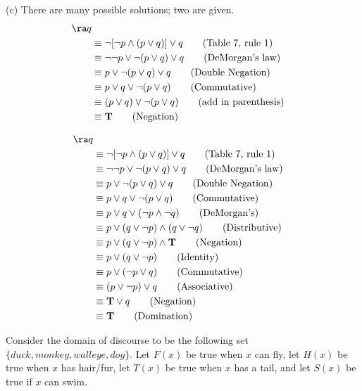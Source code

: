 \begin{questions}
\begin{solution}
    (c)
    There are many possible solutions; two are given.
	\small
    \begin{align*}
        [ \neg p & \wedge (p \vee q) ] \ra q \\
        & \equiv \neg [ \neg p \wedge (p \vee q) ] \vee q \tag{Table 7, rule 1} \\
        & \equiv \neg \neg p \vee \neg (p \vee q) \vee q \tag{DeMorgan's law} \\
        & \equiv p \vee \neg (p \vee q) \vee q \tag{Double Negation} \\
        & \equiv p \vee q \vee \neg (p \vee q) \tag{Commutative} \\
        & \equiv (p \vee q) \vee \neg (p \vee q) \tag{add in parenthesis}\\
        & \equiv \mathbf{T} \tag{Negation} 
    \end{align*}

    \begin{align*}
        [ \neg p & \wedge (p \vee q) ] \ra q \\
        & \equiv \neg [ \neg p \wedge (p \vee q) ] \vee q \tag{Table 7, rule 1} \\
        & \equiv \neg \neg p \vee \neg (p \vee q) \vee q \tag{DeMorgan's law} \\
        & \equiv p \vee \neg (p \vee q) \vee q \tag{Double Negation} \\
        & \equiv p \vee q \vee \neg (p \vee q) \tag{Commutative} \\
        & \equiv p \vee q \vee (\neg p \wedge \neg q) \tag{DeMorgan's} \\
        & \equiv p \vee (q \vee \neg p) \wedge (q \vee \neg q) \tag{Distributive} \\
        & \equiv p \vee (q \vee \neg p) \wedge \mathbf{T} \tag{Negation} \\
        & \equiv p \vee (q \vee \neg p) \tag{Identity} \\
        & \equiv p \vee (\neg p \vee q) \tag{Commutative} \\
        & \equiv (p \vee \neg p) \vee q \tag{Associative} \\
        & \equiv \mathbf{T} \vee q \tag{Negation} \\
        & \equiv \mathbf{T} \tag{Domination}
    \end{align*}
    \end{solution}


  Consider the domain of discourse to be the following set $ \{ duck, monkey, walleye, dog \}$.  Let $F(x)$ be true when $x$ can fly, let $H(x)$ be true when $x$ has hair/fur, let $T(x)$ be true when $x$ has a tail, and let $S(x)$ be true if $x$ can swim. 


\end{questions}
